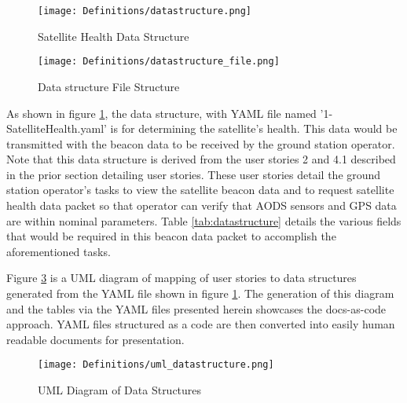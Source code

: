 \documentclass[journal,article,submit,pdftex,moreauthors]{Definitions/mdpi}
\begin{document}
\begin{figure}[H]
    \texttt{[image: Definitions/datastructure.png]}
    \caption{Satellite Health Data Structure}
	\label{fig:datastructure}
    \end{figure}   
\unskip

\begin{figure}[H]
    \texttt{[image: Definitions/datastructure\_file.png]}
    \caption{Data structure File Structure}
	\label{fig:datastructure_file}
    \end{figure}
	\noindent   
\unskip

As shown in figure \ref{fig:datastructure}, the data structure, with YAML file named '1-SatelliteHealth.yaml' is for determining the satellite's health.  This data would be transmitted with the beacon data to be received by the ground station operator.  Note that this data structure is derived from the user stories 2 and 4.1 described in the prior section detailing user stories.  These user stories detail the ground station operator's tasks to view the satellite beacon data and to request satellite health data packet so that operator can verify that AODS sensors and GPS data are within nominal parameters.  Table \ref{tab:datastructure} details the various fields that would be required in this beacon data packet to accomplish the aforementioned tasks.

Figure \ref{fig:uml_datastructure} is a UML diagram of mapping of user stories to data structures generated from the YAML file shown in figure \ref{fig:datastructure}.  The generation of this diagram and the tables via the YAML files presented herein showcases the docs-as-code approach.  YAML files structured as a code are then converted into easily human readable documents for presentation.

\begin{figure}[H]
    \texttt{[image: Definitions/uml\_datastructure.png]}
    \caption{UML Diagram of Data Structures}
	\label{fig:uml_datastructure}
    \end{figure}   
\unskip
\end{document}

